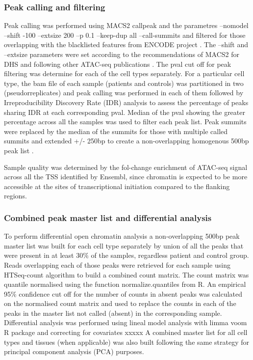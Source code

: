 \subsubsection{Peak calling and filtering}
Peak calling was performed using MACS2  callpeak \parencite{} and the parametres --nomodel --shift -100 --extsize 200 --p 0.1 --keep-dup all --call-summits and filtered for those overlapping with the blacklisted features from ENCODE project \parencite{}. The --shift and --extsize parameters were set according to the recommendations of MACS2 for DHS and following other ATAC-seq publications \parencite{Buenrostro2015, Corces2016}. The pval cut off for peak filtering was determine for each of the cell types separately. 
For a particular cell type, the bam file of each sample (patients and controls) was partitioned in two (pseudorreplicates) and peak calling was performed in each of them followed by Irreproducibility Discovery Rate (IDR) analysis to assess the percentage of peaks sharing IDR at each corresponding pval. Median of the pval showing the greater percentage across all the samples was used to filter each peak list. Peak summits were replaced by the median of the summits for those with multiple called summits and extended +/- 250bp to create a non-overlapping homogenous 500bp peak list \parencite{Buenrostro2015, Corces2016}. 

Sample quality was determined by the fol-change enrichment of ATAC-seq signal across all the TSS identified by Ensembl, since chromatin is expected to be more accessible at the sites of transcriptional initiation compared to the flanking regions.  

\subsubsection{Combined peak master list and differential analysis}
To perform differential open chromatin analysis a non-overlapping 500bp peak master list was built for each cell type separately by union of all the peaks that were present in at least 30\% of the samples, regardless patient and control group. Reads overlapping each of those peaks were retrieved for each sample using HTSeq-count algorithm \parencite{} to build a combined count matrix. The count matrix was quantile normalised using the function normalize.quantiles from R. An empirical 95\% confidence cut off for the number of counts in absent peaks was calculated on the normalised count matrix \parencite{Xinmin2005,Jonker2014} and used to replace the counts in each of the peaks in the master list not called (absent) in the corresponding sample. Differential analysis was performed using lineal model analysis with limma voom R package and correcting for covariates xxxxx
A combined master list for all cell types and tissues (when applicable) was also built following the same strategy for principal component analysis (PCA) purposes. 





